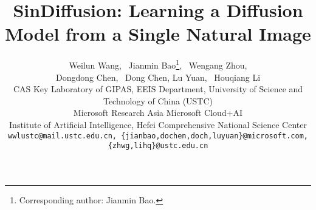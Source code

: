 \documentclass[10pt,twocolumn,letterpaper]{article}
\begin{document}
\title{\vspace{-16mm}SinDiffusion: Learning a Diffusion Model from a Single Natural Image \vspace{-6mm}}

\author{Weilun Wang{\small }, ~Jianmin Bao{\small }\thanks{Corresponding author: Jianmin Bao.}, ~Wengang Zhou{\small }, \\
Dongdong Chen{\small }, ~Dong Chen{\small }, Lu Yuan{\small }, ~Houqiang Li{\small }\\
\normalsize
 CAS Key Laboratory of GIPAS, EEIS Department, University of Science and Technology of China (USTC) \\
\normalsize
 Microsoft Research Asia \enspace \enspace \enspace  Microsoft Cloud+AI\\
\normalsize
 Institute of Artificial Intelligence, Hefei Comprehensive National Science Center\\
\normalsize
{\tt\small wwlustc@mail.ustc.edu.cn, \{jianbao,dochen,doch,luyuan\}@microsoft.com, \{zhwg,lihq\}@ustc.edu.cn}
}

\end{document}
